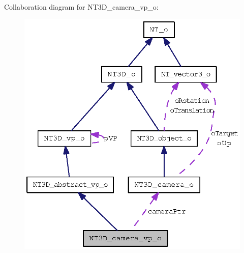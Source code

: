 Collaboration diagram for NT3D\_\-camera\_\-vp\_\-o:
\nopagebreak
\begin{figure}[H]
\begin{center}
\leavevmode
\includegraphics[width=327pt]{class_n_t3_d__camera__vp__o__coll__graph}
\end{center}
\end{figure}
